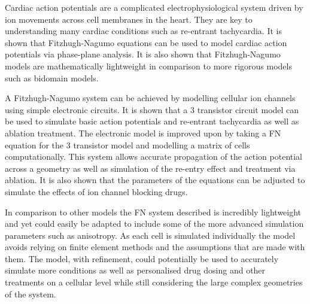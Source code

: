Cardiac action potentials are a complicated electrophysiological system driven by ion movements across cell membranes in the heart. They are key to understanding many cardiac conditions such as re-entrant tachycardia. It is shown that Fitzhugh-Nagumo equations can be used to model cardiac action potentials via phase-plane analysis. It is also shown that Fitzhugh-Nagumo models are mathematically lightweight in comparison to more rigorous models such as bidomain models. \par
A Fitzhugh-Nagumo system can be achieved by modelling cellular ion channels using simple electronic circuits. It is shown that a 3 transistor circuit model can be used to simulate basic action potentials and re-entrant tachycardia as well as ablation treatment. The electronic model is improved upon by taking a FN equation for the 3 transistor model and modelling a matrix of cells computationally. This system allows accurate propagation of the action potential across a geometry as well as simulation of the re-entry effect and treatment via ablation. It is also shown that the parameters of the equations can be adjusted to simulate the effects of ion channel blocking drugs. \par
In comparison to other models the FN system described is incredibly lightweight and yet could easily be adapted to include some of the more advanced simulation parameters such as anisotropy. As each cell is simulated individually the model avoids relying on finite element methods and the assumptions that are made with them. The model, with refinement, could potentially be used to accurately simulate more conditions as well as personalised drug dosing and other treatments on a cellular level while still considering the large complex geometries of the system.